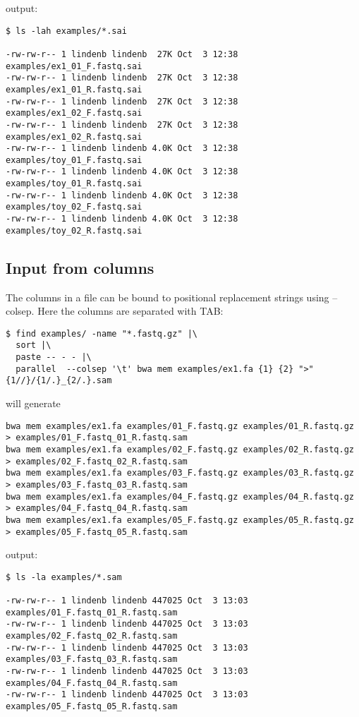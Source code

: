 \documentclass{article}
\begin{document}
output:
\begin{lstlisting}
$ ls -lah examples/*.sai

-rw-rw-r-- 1 lindenb lindenb  27K Oct  3 12:38 examples/ex1_01_F.fastq.sai
-rw-rw-r-- 1 lindenb lindenb  27K Oct  3 12:38 examples/ex1_01_R.fastq.sai
-rw-rw-r-- 1 lindenb lindenb  27K Oct  3 12:38 examples/ex1_02_F.fastq.sai
-rw-rw-r-- 1 lindenb lindenb  27K Oct  3 12:38 examples/ex1_02_R.fastq.sai
-rw-rw-r-- 1 lindenb lindenb 4.0K Oct  3 12:38 examples/toy_01_F.fastq.sai
-rw-rw-r-- 1 lindenb lindenb 4.0K Oct  3 12:38 examples/toy_01_R.fastq.sai
-rw-rw-r-- 1 lindenb lindenb 4.0K Oct  3 12:38 examples/toy_02_F.fastq.sai
-rw-rw-r-- 1 lindenb lindenb 4.0K Oct  3 12:38 examples/toy_02_R.fastq.sai
\end{lstlisting}

\subsection{Input from columns}

The columns in a file can be bound to positional replacement strings using --colsep. Here the columns are separated with TAB:

\begin{lstlisting}
$ find examples/ -name "*.fastq.gz" |\
  sort |\
  paste -- - - |\
  parallel  --colsep '\t' bwa mem examples/ex1.fa {1} {2} ">" {1//}/{1/.}_{2/.}.sam
\end{lstlisting}
will generate
\begin{lstlisting}
bwa mem examples/ex1.fa examples/01_F.fastq.gz examples/01_R.fastq.gz > examples/01_F.fastq_01_R.fastq.sam
bwa mem examples/ex1.fa examples/02_F.fastq.gz examples/02_R.fastq.gz > examples/02_F.fastq_02_R.fastq.sam
bwa mem examples/ex1.fa examples/03_F.fastq.gz examples/03_R.fastq.gz > examples/03_F.fastq_03_R.fastq.sam
bwa mem examples/ex1.fa examples/04_F.fastq.gz examples/04_R.fastq.gz > examples/04_F.fastq_04_R.fastq.sam
bwa mem examples/ex1.fa examples/05_F.fastq.gz examples/05_R.fastq.gz > examples/05_F.fastq_05_R.fastq.sam
\end{lstlisting}
output:
\begin{lstlisting}
$ ls -la examples/*.sam

-rw-rw-r-- 1 lindenb lindenb 447025 Oct  3 13:03 examples/01_F.fastq_01_R.fastq.sam
-rw-rw-r-- 1 lindenb lindenb 447025 Oct  3 13:03 examples/02_F.fastq_02_R.fastq.sam
-rw-rw-r-- 1 lindenb lindenb 447025 Oct  3 13:03 examples/03_F.fastq_03_R.fastq.sam
-rw-rw-r-- 1 lindenb lindenb 447025 Oct  3 13:03 examples/04_F.fastq_04_R.fastq.sam
-rw-rw-r-- 1 lindenb lindenb 447025 Oct  3 13:03 examples/05_F.fastq_05_R.fastq.sam
\end{lstlisting}
\end{document}
